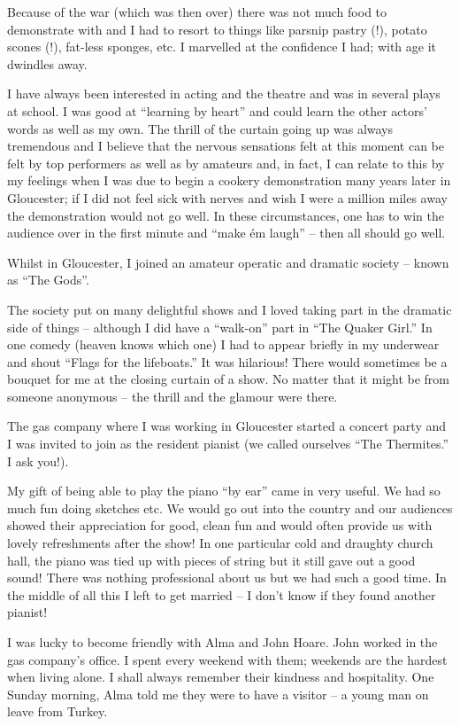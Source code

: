 Because of the war (which was then over) there was not much food to
demonstrate with and I had to resort to things like parsnip pastry
(!), potato scones (!), fat-less sponges, etc. I marvelled at the
confidence I had; with age it dwindles away.

I have always been interested in acting and the theatre and was in
several plays at school. I was good at ``learning by heart'' and could
learn the other actors' words as well as my own. The thrill of the
curtain going up was always tremendous and I believe that the nervous
sensations felt at this moment can be felt by top performers as well
as by amateurs and, in fact, I can relate to this by my feelings when
I was due to begin a cookery demonstration many years later in
Gloucester; if I did not feel sick with nerves and wish I were a
million miles away the demonstration would not go well. In these
circumstances, one has to win the audience over in the first minute
and ``make \'em laugh'' -- then all should go well.

Whilst in Gloucester, I joined an amateur operatic and dramatic
society -- known as ``The Gods''.

The society put on many delightful shows and I loved taking part in
the dramatic side of things -- although I did have a ``walk-on'' part
in ``The Quaker Girl.'' In one comedy (heaven knows which one) I had
to appear briefly in my underwear and shout ``Flags for the
lifeboats.'' It was hilarious! There would sometimes be a bouquet for
me at the closing curtain of a show. No matter that it might be from
someone anonymous -- the thrill and the glamour were there.

The gas company where I was working in Gloucester started a concert
party and I was invited to join as the resident pianist (we called
ourselves ``The Thermites.'' I ask you!).

My gift of being able to play the piano ``by ear'' came in very
useful. We had so much fun doing sketches etc. We would go out into
the country and our audiences showed their appreciation for good,
clean fun and would often provide us with lovely refreshments after
the show! In one particular cold and draughty church hall, the piano
was tied up with pieces of string but it still gave out a good sound!
There was nothing professional about us but we had such a good
time. In the middle of all this I left to get married -- I don't know
if they found another pianist!

I was lucky to become friendly with Alma and John Hoare. John worked
in the gas company's office. I spent every weekend with them; weekends
are the hardest when living alone. I shall always remember their
kindness and hospitality. One Sunday morning, Alma told me they were
to have a visitor -- a young man on leave from Turkey.


